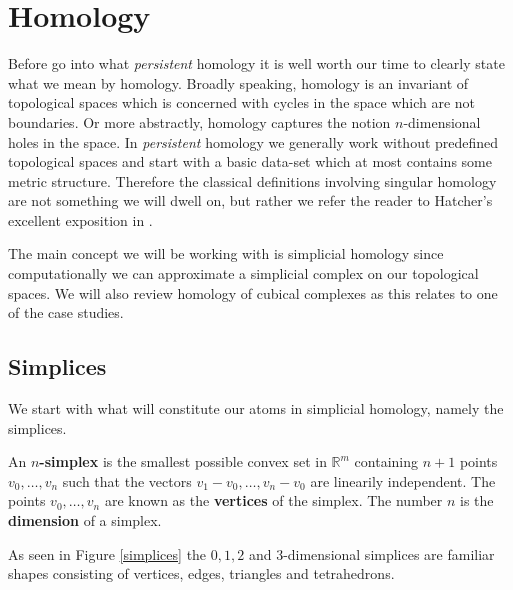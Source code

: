\chapter{Homology}
Before go into what \textit{persistent} homology it is well worth our time to clearly state what we mean by homology. Broadly speaking, homology is an invariant of topological spaces which is concerned with cycles in the space which are not boundaries. Or more abstractly, homology captures the notion $n$-dimensional holes in the space. In \textit{persistent} homology we generally work without predefined topological spaces and start with a basic data-set which at most contains some metric structure. Therefore the classical definitions involving singular homology are not something we will dwell on, but rather we refer the reader to Hatcher's excellent exposition in \cite{hatcher2002}.

The main concept we will be working with is simplicial homology since computationally we can approximate a simplicial complex on our topological spaces. We will also review homology of cubical complexes as this relates to one of the case studies.
\section{Simplices}
We start with what will constitute our atoms in simplicial homology, namely the simplices.
\begin{definition}
An \textbf{$n$-simplex} is the smallest possible convex set in $\mathbb{R}^{m}$ containing $n+1$ points $v_{0},\dots,v_{n}$ such that the vectors $v_{1}-v_{0}, \dots, v_{n} - v_{0}$ are linearily independent. The points $v_{0},\dots,v_{n}$ are known as the \textbf{vertices} of the simplex. The number $n$ is the \textbf{dimension} of a simplex.
\end{definition}
As seen in Figure \ref{simplices} the $0,1,2$ and $3$-dimensional simplices are familiar shapes consisting of vertices, edges, triangles and tetrahedrons.

